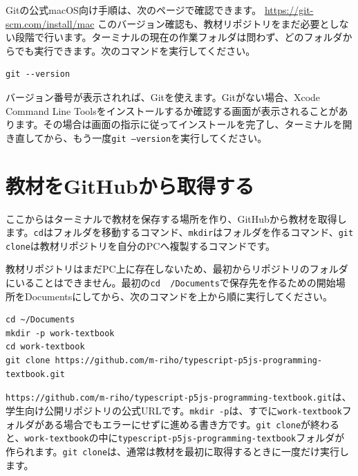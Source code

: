 Gitの公式macOS向け手順は、次のページで確認できます。
\url{https://git-scm.com/install/mac}
このバージョン確認も、教材リポジトリをまだ必要としない段階で行います。ターミナルの現在の作業フォルダは問わず、どのフォルダからでも実行できます。次のコマンドを実行してください。

\begin{listing}[htbp]
\begin{verbatim}
git --version
\end{verbatim}
\caption{Gitのバージョンを確認するコマンド}
\label{lst:appendix-macos-check-git}
\end{listing}

バージョン番号が表示されれば、Gitを使えます。Gitがない場合、Xcode Command Line Toolsをインストールするか確認する画面が表示されることがあります。その場合は画面の指示に従ってインストールを完了し、ターミナルを開き直してから、もう一度\texttt{git --version}を実行してください。

\section{教材をGitHubから取得する}

ここからはターミナルで教材を保存する場所を作り、GitHubから教材を取得します。\texttt{cd}はフォルダを移動するコマンド、\texttt{mkdir}はフォルダを作るコマンド、\texttt{git clone}は教材リポジトリを自分のPCへ複製するコマンドです。

教材リポジトリはまだPC上に存在しないため、最初からリポジトリのフォルダにいることはできません。最初の\texttt{cd ~/Documents}で保存先を作るための開始場所をDocumentsにしてから、次のコマンドを上から順に実行してください。

\begin{listing}[htbp]
\begin{verbatim}
cd ~/Documents
mkdir -p work-textbook
cd work-textbook
git clone https://github.com/m-riho/typescript-p5js-programming-textbook.git
\end{verbatim}
\caption{教材を保存するフォルダを作成してリポジトリを取得するコマンド}
\label{lst:appendix-macos-git-clone}
\end{listing}

\texttt{https://github.com/m-riho/typescript-p5js-programming-textbook.git}は、学生向け公開リポジトリの公式URLです。\texttt{mkdir -p}は、すでに\texttt{work-textbook}フォルダがある場合でもエラーにせずに進める書き方です。\texttt{git clone}が終わると、\texttt{work-textbook}の中に\texttt{typescript-p5js-programming-textbook}フォルダが作られます。\texttt{git clone}は、通常は教材を最初に取得するときに一度だけ実行します。

